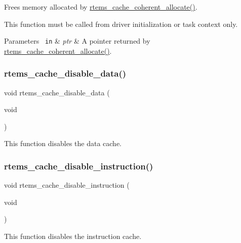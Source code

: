 Frees memory allocated by \mbox{\hyperlink{group__ClassicCache_ga026115893a08faf480fec18555ce6c26}{rtems\+\_\+cache\+\_\+coherent\+\_\+allocate()}}. 

This function must be called from driver initialization or task context only.


\begin{DoxyParams}[1]{Parameters}
\mbox{\texttt{ in}}  & {\em ptr} & A pointer returned by \mbox{\hyperlink{group__ClassicCache_ga026115893a08faf480fec18555ce6c26}{rtems\+\_\+cache\+\_\+coherent\+\_\+allocate()}}. \\
\hline
\end{DoxyParams}
\mbox{\label{group__ClassicCache_ga60fb68aba331040c536e8ab238d2f5f3}} 
\subsubsection{\texorpdfstring{rtems\_cache\_disable\_data()}{rtems\_cache\_disable\_data()}}
{\footnotesize\ttfamily void rtems\+\_\+cache\+\_\+disable\+\_\+data (\begin{DoxyParamCaption}\item[{void}]{ }\end{DoxyParamCaption})}

This function disables the data cache. \mbox{\label{group__ClassicCache_ga568ced5f7d37af19cc883e3f241eb143}} 
\subsubsection{\texorpdfstring{rtems\_cache\_disable\_instruction()}{rtems\_cache\_disable\_instruction()}}
{\footnotesize\ttfamily void rtems\+\_\+cache\+\_\+disable\+\_\+instruction (\begin{DoxyParamCaption}\item[{void}]{ }\end{DoxyParamCaption})}

This function disables the instruction cache. \mbox{\label{group__ClassicCache_ga529dbf2f354951145a4cdc50e4ef9e21}} 
